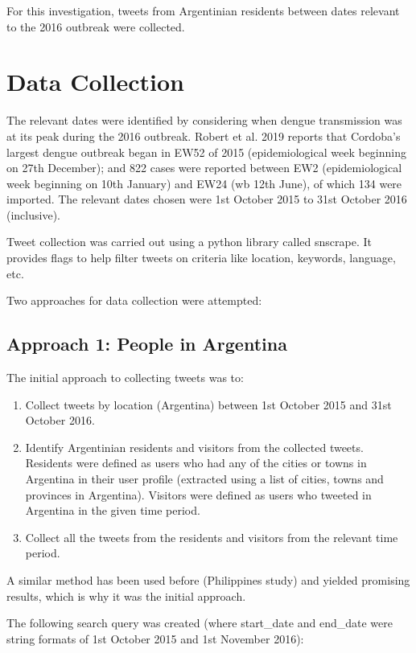For this investigation, tweets from Argentinian residents between dates relevant to the 2016 outbreak were collected.

\section{Data Collection}

The relevant dates were identified by considering when dengue transmission was at its peak during the 2016 outbreak. Robert et al. 2019 reports that Cordoba’s largest dengue outbreak began in EW52 of 2015 (epidemiological week beginning on 27th December); and 822 cases were reported between EW2 (epidemiological week beginning on 10th January) and EW24 (wb 12th June), of which 134 were imported. The relevant dates chosen were 1st October 2015 to 31st October 2016 (inclusive).

Tweet collection was carried out using a python library called {\selectfont snscrape}. It provides
flags to help filter tweets on criteria like location, keywords, language, etc.

Two approaches for data collection were attempted:

\subsection{Approach 1: People in Argentina} \label{approach-1}

The initial approach to collecting tweets was to:

\begin{enumerate}
    \item Collect tweets by location (Argentina) between 1st October 2015 and 31st October 2016.
    \item Identify Argentinian residents and visitors from the collected tweets. Residents were defined as users who had any of the cities or towns in Argentina in their user profile (extracted using a list of cities, towns and provinces in Argentina). Visitors were defined as users who tweeted in Argentina in the given time period.
    \item Collect all the tweets from the residents and visitors from the relevant time period.
\end{enumerate}

A similar method has been used before (Philippines study) and yielded promising results, which is why it was the initial approach.

The following search query was created (where {\selectfont start\_date} and {\selectfont end\_date} were string formats of 1st October 2015 and 1st November 2016):

